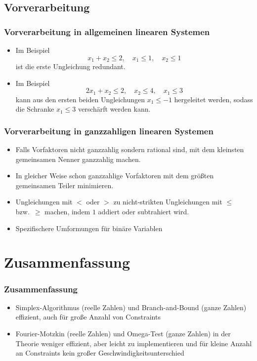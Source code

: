 \documentclass[hyperref={pdfpagelabels=false}]{beamer}
\begin{document}
\subsection{Vorverarbeitung}
\begin{frame}
	\frametitle{Vorverarbeitung in allgemeinen linearen Systemen}
	\begin{itemize}
		\item Im Beispiel
			\[ x_1 + x_2 \leq 2, \quad x_1 \leq 1, \quad x_2 \leq 1 \]
			ist die erste Ungleichung redundant. %
		\item Im Beispiel
			\[ 2x_1 + x_2 \leq 2, \quad x_2 \leq 4, \quad x_1 \leq 3 \]
			kann aus den ersten beiden Ungleichungen $x_1 \leq -1$ hergeleitet werden, sodass die Schranke $x_1 \leq 3$ verschärft werden kann.
	\end{itemize}
\end{frame}
\begin{frame}
	\frametitle{Vorverarbeitung in ganzzahligen linearen Systemen}
	\begin{itemize}
		\item Falls Vorfaktoren nicht ganzzahlig sondern rational sind, mit dem kleinsten gemeinsamen Nenner ganzzahlig machen.
		\item In gleicher Weise schon ganzzahlige Vorfaktoren mit dem größten gemeinsamen Teiler minimieren. %
		\item Ungleichungen mit $<$ oder $>$ zu nicht-strikten Ungleichungen mit $\leq$ bzw.\ $\geq$ machen, indem $1$ addiert oder subtrahiert wird.
		\item Spezifischere Umformungen für binäre Variablen
	\end{itemize}
\end{frame}
\section{Zusammenfassung}
\begin{frame}
	\frametitle{Zusammenfassung}
	\begin{itemize}
		\item Simplex-Algorithmus (reelle Zahlen) und Branch-and-Bound (ganze Zahlen) effizient, auch für große Anzahl von Constraints
		\item Fourier-Motzkin (reelle Zahlen) und Omega-Test (ganze Zahlen) in der Theorie weniger effizient, aber leicht zu implementieren und für kleine Anzahl an Constraints kein großer Geschwindigkeitsunterschied
	\end{itemize}
\end{frame}
\end{document}
